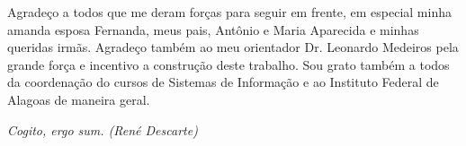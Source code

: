 \documentclass[
	12pt,				%
	openany,			%
	oneside,			%
	a4paper,			%
	english,			%
	french,				%
	spanish,			%
	brazil				%
	]{abntex2}
\begin{document}
\begin{agradecimentos}

Agradeço a todos que me deram forças para seguir em frente, em especial minha amanda esposa Fernanda, meus pais, Antônio e Maria Aparecida e minhas queridas irmãs. Agradeço também ao meu orientador Dr. Leonardo Medeiros pela grande força e incentivo a construção deste trabalho. Sou grato também a todos da coordenação do cursos de Sistemas de Informação e ao Instituto Federal de Alagoas de maneira geral. 

\end{agradecimentos}

\begin{epigrafe}
    \vspace*{\fill}
	\begin{flushright}
		\textit{Cogito, ergo sum. (René Descarte)}
	\end{flushright}
\end{epigrafe}

\end{document}
